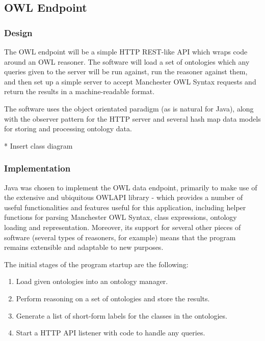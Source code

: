 \documentclass{article}
\begin{document}
\subsection{OWL Endpoint}

\subsubsection{Design}

The OWL endpoint will be a simple HTTP REST-like API which wraps code around an
OWL reasoner. The software will load a set of ontologies which any queries given
to the server will be run against, run the reasoner against them, and then set
up a simple server to accept Manchester OWL Syntax requests and return the
results in a machine-readable format.

The software uses the object orientated paradigm (as is natural for Java), along
with the observer pattern for the HTTP server and several hash map data models
for storing and processing ontology data.

* Insert class diagram

\subsubsection{Implementation}

Java was chosen to implement the OWL data endpoint, primarily to make use of the
extensive and ubiquitous OWLAPI library - which provides a number of useful
functionalities and features useful for this application, including helper
functions for parsing Manchester OWL Syntax, class expressions, ontology loading
and representation. Moreover, its support for several other pieces of software
(several types of reasoners, for example) means that the program remains
extensible and adaptable to new purposes.

The initial stages of the program startup are the following:

\begin{enumerate}
    \item Load given ontologies into an ontology manager. 
    \item Perform reasoning on a set of ontologies and store the results.
    \item Generate a list of short-form labels for the classes in the
    ontologies.
    \item Start a HTTP API listener with code to handle any queries.
\end{enumerate}
\end{document}
